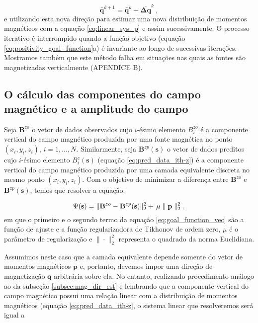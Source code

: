 \begin{equation}
\bar{\mathbf{q}}^{k+1} = \bar{\mathbf{q}}^{k} + \bar{\mathbf{\Delta q}}^{k} \: ,
\label{eq:q_next}
\end{equation}
e utilizando esta nova direção para estimar uma nova distribuição de momentos magnéticos com a equação \ref{eq:linear_sys_p} e assim sucessivamente. O processo iterativo é interrompido quando a função objetivo (equação \ref{eq:positivity_goal_function}a) é invariante ao longo de sucessivas iterações. Mostramos também que este método falha em situações nas quais as fontes são magnetizadas verticalmente (APENDICE B).

\subsection{O cálculo das componentes do campo magnético e a amplitude do campo}
\label{subsec:componentes_vec}

Seja $\mathbf{B}^{zo}$ o vetor de dados observados cujo $i$-ésimo elemento $B_{i}^{zo}$ é a componente vertical do campo magnético produzida por uma fonte magnética no ponto $(x_{i},y_{i},z_{i})$, $i = 1, \dots, N$. Similarmente, seja $\mathbf{B}^{zp} (\mathbf{s})$ o vetor de dados preditos cujo $i$-ésimo elemento $B_{i}^{z}(\mathbf{s})$ (equação \ref{eq:pred_data_ith-z}) é a componente vertical do campo magnético produzida por uma camada equivalente discreta no mesmo ponto $(x_{i},y_{i},z_{i})$. Com o objetivo de minimizar a diferença entre $\mathbf{B}^{zo}$ e $\mathbf{B}^{zp} (\mathbf{s})$, temos que resolver a equação:

\begin{equation}
\Psi(\mathbf{s}) =\lVert \mathbf{B}^{zo} - \mathbf{B}^{zp} (\mathbf{s}) 
	\rVert_{2}^{2} + \, \mu  \parallel \mathbf{p} \parallel_{2}^{2} \: , \\
\label{eq:goal_function_vec}
\end{equation}
em que o primeiro e o segundo termo da equação \ref{eq:goal_function_vec} são a função de ajuste e a função regularizadora de Tikhonov de ordem zero, $\mu$ é o parâmetro de regularização e $\| \cdot \|_{2}^{2}$ representa o quadrado da norma Euclidiana. 

Assumimos neste caso que a camada equivalente depende somente do vetor de momentos magnéticos $\mathbf{p}$ e, portanto, devemos impor uma direção de magnetização $\mathbf{q}$ arbitrária sobre ela. No entanto, realizando procedimento análogo ao da subseção \ref{subsec:mag_dir_est} e lembrando que a componente vertical do campo magnético possui uma relação linear com a distribuição de momentos magnéticos (equação \ref{eq:pred_data_ith-z}, o sistema linear que resolveremos será igual a 


